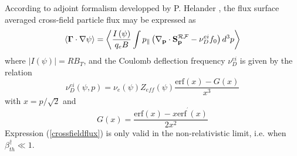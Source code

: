According to adjoint formalism developped by P. Helander \cite{hel05}, the
flux surface averaged cross-field particle flux may be expressed as
\begin{equation}
\left\langle \mathbf{\Gamma }\cdot \nabla \psi \right\rangle =\left\langle
\frac{I\left( \psi \right) }{q_{e}B}\int p_{\Vert }\left( \mathbf{\nabla }_{%
\mathbf{p}}\cdot \mathbf{S}_{\mathbf{p}}^{\mathcal{RF}}-\nu
_{D}^{ei}f_{0}\right) d^{3}p\right\rangle  \label{crossfieldflux}
\end{equation}
where $\left| I\left( \psi \right) \right| =RB_{T}$, and the Coulomb
deflection frequency $\nu _{D}^{ei}$ is given by the relation
\begin{equation}
\nu _{D}^{ei}\left( \psi ,p\right) =\nu _{e}\left( \psi \right)
Z_{eff}\left( \psi \right) \frac{\text{erf}\left( x\right) -G\left( x\right)
}{x^{3}}
\end{equation}
with $x=p/\sqrt{2}$ and
\begin{equation}
G\left( x\right) =\frac{\text{erf}\left( x\right) -x\text{erf}^{^{\prime
}}\left( x\right) }{2x^{2}}
\end{equation}
Expression (\ref{crossfieldflux}) is only valid in the non-relativistic
limit, i.e. when $\beta _{th}^{\dag }\ll 1.$

